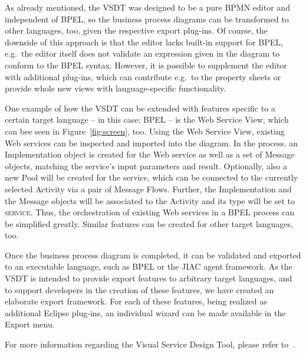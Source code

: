 As already mentioned, the VSDT was designed to be a pure BPMN editor and independent
of BPEL, so the business process diagrams can be transformed to other languages,
too, given the respective export plug-ins.  Of course, the downside of this approach
is that the editor lacks built-in support for BPEL, e.g.\ the editor itself does
not validate an expression given in the diagram to conform to the BPEL syntax.
However, it is possible to supplement the editor with additional plug-ins, which
can contribute e.g.\ to the property sheets or provide whole new views with
language-specific functionality.

One example of how the VSDT can be extended with features specific to a certain
target language -- in this case: BPEL -- is the Web Service View, which can bee
seen in Figure~\ref{fig:screen}, too.  Using the Web Service View, existing Web
services can be inspected and imported into the diagram.  In the process, an
Implementation object is created for the Web service as well as a set of Message
objects, matching the service's input parameters and result.  Optionally, also a
new Pool will be created for the service, which can be connected to the currently
selected Activity via a pair of Message Flows.  Further, the Implementation and
the Message objects will be associated to the Activity and its type will be set
to \textsc{service}.  Thus, the orchestration of existing Web services in a BPEL
process can be simplified greatly.  Similar features can be created for other
target languages, too.

Once the business process diagram is completed, it can be validated and exported
to an executable language, such as BPEL or the JIAC agent framework.  As the VSDT
is intended to provide export features to arbitrary target languages, and to
support developers in the creation of these features, we have created an elaborate
export framework.  For each of these features, being realized as additional
Eclipse plug-ins, an individual wizard can be made available in the Export menu.

For more information regarding the Visual Service Design Tool, please refer
to~\cite{kuester2008towards}.




